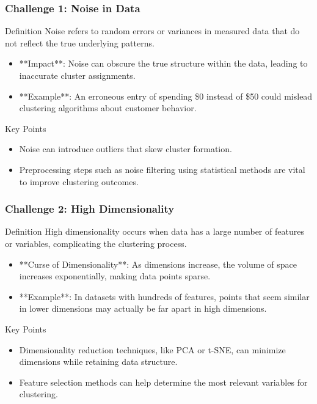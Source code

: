\documentclass[aspectratio=169]{beamer}
\begin{document}
\begin{frame}[fragile]
    \frametitle{Challenge 1: Noise in Data}
    \begin{block}{Definition}
        Noise refers to random errors or variances in measured data that do not reflect the true underlying patterns.
    \end{block}
    
    \begin{itemize}
        \item **Impact**: Noise can obscure the true structure within the data, leading to inaccurate cluster assignments.
        \item **Example**: An erroneous entry of spending \$0 instead of \$50 could mislead clustering algorithms about customer behavior.
    \end{itemize}

    \begin{block}{Key Points}
        \begin{itemize}
            \item Noise can introduce outliers that skew cluster formation.
            \item Preprocessing steps such as noise filtering using statistical methods are vital to improve clustering outcomes.
        \end{itemize}
    \end{block}
\end{frame}

\begin{frame}[fragile]
    \frametitle{Challenge 2: High Dimensionality}
    \begin{block}{Definition}
        High dimensionality occurs when data has a large number of features or variables, complicating the clustering process.
    \end{block}
    
    \begin{itemize}
        \item **Curse of Dimensionality**: As dimensions increase, the volume of space increases exponentially, making data points sparse.
        \item **Example**: In datasets with hundreds of features, points that seem similar in lower dimensions may actually be far apart in high dimensions.
    \end{itemize}
    
    \begin{block}{Key Points}
        \begin{itemize}
            \item Dimensionality reduction techniques, like PCA or t-SNE, can minimize dimensions while retaining data structure.
            \item Feature selection methods can help determine the most relevant variables for clustering.
        \end{itemize}
    \end{block}
\end{frame}
\end{document}
